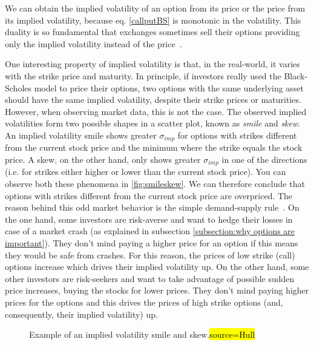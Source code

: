 We can obtain the implied volatility of an option from its price or the price from its implied volatility, because eq. \eqref{callputBS} is monotonic in the volatility. This duality is so fundamental that exchanges sometimes sell their options providing only the implied volatility instead of the price~\citep{Wilmott}.

One interesting property of implied volatility is that, in the real-world, it varies with the strike price and maturity. In principle, if investors really used the Black-Scholes model to price their options, two options with the same underlying asset should have the same implied volatility, despite their strike prices or maturities.
However, when observing market data, this is not the case. The observed implied volatilities form two possible shapes in a scatter plot, known as \emph{smile} and \emph{skew}.
An implied volatility smile shows greater $\sigma_{imp}$ for options with strikes different from the current stock price and the minimum where the strike equals the stock price. A skew, on the other hand, only shows greater $\sigma_{imp}$ in one of the directions (i.e. for strikes either higher or lower than the current stock price). You can observe both these phenomena in \autoref{fig:smileskew}.
We can therefore conclude that options with strikes different from the current stock price are overpriced.
The reason behind this odd market behavior is the simple demand-supply rule~\citep{Wilmott}. On the one hand, some investors are risk-averse and want to hedge their losses in case of a market crash (as explained in subsection \ref{subsection:why options are important}). They don't mind paying a higher price for an option if this means they would be safe from crashes. For this reason, the prices of low strike (call) options increase which drives their implied volatility up. On the other hand, some other investors are risk-seekers and want to take advantage of possible sudden price increases, buying the stocks for lower prices. They don't mind paying higher prices for the options and this drives the prices of high strike options (and, consequently, their implied volatility) up.
    
    
\begin{figure}[!htb]
  \begin{subfigmatrix}{2}
  \end{subfigmatrix}
  \caption{Example of an implied volatility smile and skew.\hl{source=Hull}}
  \label{fig:smileskew}
\end{figure}

